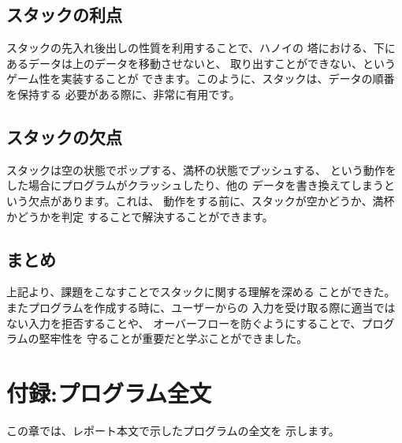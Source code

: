 \documentclass[a4j]{jarticle}
\begin{document}
\subsection{スタックの利点}
スタックの先入れ後出しの性質を利用することで、ハノイの
塔における、下にあるデータは上のデータを移動させないと、
取り出すことができない、というゲーム性を実装することが
できます。このように、スタックは、データの順番を保持する
必要がある際に、非常に有用です。
\subsection{スタックの欠点}
スタックは空の状態でポップする、満杯の状態でプッシュする、
という動作をした場合にプログラムがクラッシュしたり、他の
データを書き換えてしまうという欠点があります。これは、
動作をする前に、スタックが空かどうか、満杯かどうかを判定
することで解決することができます。

\subsection{まとめ}
上記より、課題をこなすことでスタックに関する理解を深める
ことができた。
またプログラムを作成する時に、ユーザーからの
入力を受け取る際に適当ではない入力を拒否することや、
オーバーフローを防ぐようにすることで、プログラムの堅牢性を
守ることが重要だと学ぶことができました。

\section{付録:プログラム全文}
この章では、レポート本文で示したプログラムの全文を
示します。
\end{document}
